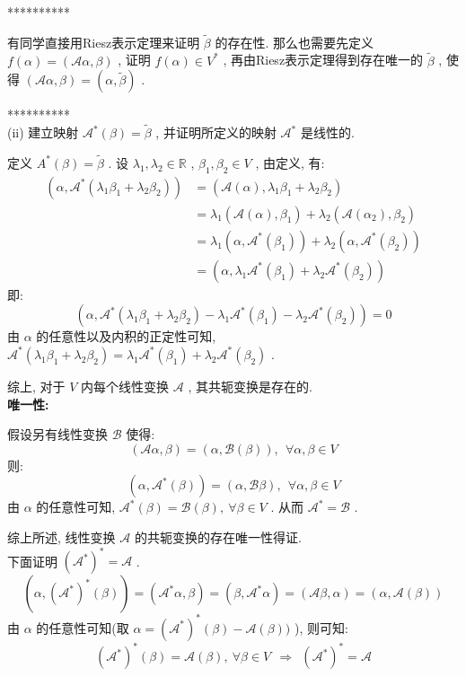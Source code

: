 \documentclass[11pt,a4paper,openany,oneside]{book}
\begin{document}
**********

有同学直接用Riesz表示定理来证明 $ \widetilde{\beta} $ 的存在性. 那么也需要先定义 $ f(\alpha) = (\mathcal{A}\alpha, \beta) $ , 证明 $ f(\alpha) \in V^* $ , 再由Riesz表示定理得到存在唯一的 $ \widetilde{\beta} $ , 使得 $ (\mathcal{A}\alpha, \beta) = (\alpha, \widetilde{\beta}) $ . 

**********  \\


(ii) 建立映射 $ \mathcal{A}^*(\beta) = \widetilde{\beta} $ , 并证明所定义的映射 $ \mathcal{A}^* $ 是线性的. 

定义 $ A^*(\beta) = \widetilde{\beta} $ . 设 $ \lambda_1, \lambda_2 \in \mathbb{R} $ ,  $ \beta_1, \beta_2 \in V $ , 由定义, 有:
\begin{align*}
(\alpha, \mathcal{A}^*(\lambda_1\beta_1+\lambda_2\beta_2)) &= (\mathcal{A}(\alpha), \lambda_1\beta_1 + \lambda_2\beta_2) \\
&= \lambda_1(\mathcal{A}(\alpha), \beta_1) + \lambda_2(\mathcal{A}(\alpha_2), \beta_2) \\
&= \lambda_1(\alpha, \mathcal{A}^*(\beta_1)) + \lambda_2(\alpha, \mathcal{A}^*(\beta_2)) \\
&= (\alpha, \lambda_1\mathcal{A}^*(\beta_1) + \lambda_2\mathcal{A}^*(\beta_2))
\end{align*}
即:
 $$  (\alpha, \mathcal{A}^*(\lambda_1\beta_1 + \lambda_2\beta_2) - \lambda_1\mathcal{A}^*(\beta_1)-\lambda_2\mathcal{A}^*(\beta_2)) =0  $$ 
由 $ \alpha $ 的任意性以及内积的正定性可知,  $ \mathcal{A}^*(\lambda_1\beta_1 + \lambda_2\beta_2) = \lambda_1\mathcal{A}^*(\beta_1) + \lambda_2\mathcal{A}^*(\beta_2) $ .

综上, 对于 $ V $ 内每个线性变换 $ \mathcal{A} $ , 其共轭变换是存在的. \\

\textbf{唯一性:}

假设另有线性变换 $ \mathcal{B} $ 使得:
 $$  (\mathcal{A}\alpha, \beta) = (\alpha, \mathcal{B}(\beta)), \ \ \forall \alpha, \beta \in V  $$ 
则:
 $$  (\alpha, \mathcal{A}^*(\beta)) = (\alpha, \mathcal{B}\beta), \ \ \forall \alpha, \beta \in V  $$ 
由 $ \alpha $ 的任意性可知,  $ \mathcal{A}^*(\beta) = \mathcal{B}(\beta),\ \forall \beta \in V $ . 从而 $ \mathcal{A}^* = \mathcal{B} $ . 

综上所述, 线性变换 $ \mathcal{A} $ 的共轭变换的存在唯一性得证.  \\

下面证明 $ (\mathcal{A}^*)^* = \mathcal{A} $ .
 $$  (\alpha, (\mathcal{A}^*)^*(\beta)) = (\mathcal{A}^*\alpha, \beta) = (\beta, \mathcal{A}^*\alpha) = (\mathcal{A}\beta, \alpha) = (\alpha, \mathcal{A}(\beta))  $$   
由 $ \alpha $ 的任意性可知(取 $ \alpha =(\mathcal{A}^*)^*(\beta)-\mathcal{A}(\beta))  $ ), 则可知:
 $$  (\mathcal{A}^*)^*(\beta) = \mathcal{A}(\beta), \ \forall \beta \in V \ \ \Rightarrow \ \ (\mathcal{A}^*)^* = \mathcal{A}   $$ 
\end{document}
